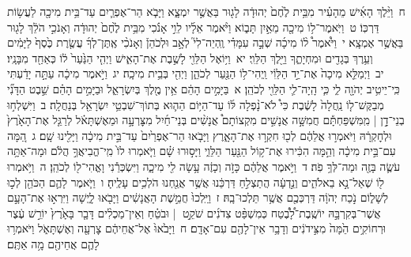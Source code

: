 \documentclass[18pt]{article}
\begin{document}
 {\loc ח~}וַיֵּ֨לֶךְ הָאִ֜ישׁ מֵהָעִ֗יר מִבֵּ֥ית לֶ֙חֶם֙ יְהוּדָ֔ה לָג֖וּר בַּאֲשֶׁ֣ר יִמְצָ֑א וַיָּבֹ֧א הַר־אֶפְרַ֛יִם עַד־בֵּ֥ית מִיכָ֖ה לַעֲשׂ֥וֹת דַּרְכּֽוֹ׃ \startlock
 {\loc ט~}וַיֹּֽאמֶר־ל֥וֹ מִיכָ֖ה מֵאַ֣יִן תָּב֑וֹא וַיֹּ֨אמֶר אֵלָ֜יו לֵוִ֣י אָנֹ֗כִי מִבֵּ֥ית לֶ֙חֶם֙ יְהוּדָ֔ה וְאָנֹכִ֣י הֹלֵ֔ךְ לָג֖וּר בַּאֲשֶׁ֥ר אֶמְצָֽא׃ \startlock
 {\loc י~}וַיֹּ֩אמֶר֩ ל֨וֹ מִיכָ֜ה שְׁבָ֣ה עִמָּדִ֗י וֶֽהְיֵה־לִי֮ לְאָ֣ב וּלְכֹהֵן֒ וְאָנֹכִ֨י אֶֽתֶּן־לְךָ֜ עֲשֶׂ֤רֶת כֶּ֙סֶף֙ לַיָּמִ֔ים וְעֵ֥רֶךְ בְּגָדִ֖ים וּמִחְיָתֶ֑ךָ וַיֵּ֖לֶךְ הַלֵּוִֽי׃ \startlock
 {\loc יא~}וַיּ֥וֹאֶל הַלֵּוִ֖י לָשֶׁ֣בֶת אֶת־הָאִ֑ישׁ וַיְהִ֤י הַנַּ֙עַר֙ ל֔וֹ כְּאַחַ֖ד מִבָּנָֽיו׃ \startlock
 {\loc יב~}וַיְמַלֵּ֤א מִיכָה֙ אֶת־יַ֣ד הַלֵּוִ֔י וַֽיְהִי־ל֥וֹ הַנַּ֖עַר לְכֹהֵ֑ן וַיְהִ֖י בְּבֵ֥ית מִיכָֽה׃ \startlock
 {\loc יג~}וַיֹּ֣אמֶר מִיכָ֔ה עַתָּ֣ה יָדַ֔עְתִּי כִּֽי־יֵיטִ֥יב יְהֹוָ֖ה לִ֑י כִּ֧י הָֽיָה־לִ֛י הַלֵּוִ֖י לְכֹהֵֽן׃ 
\startlock
 {\loc א~}בַּיָּמִ֣ים הָהֵ֔ם אֵ֥ין מֶ֖לֶךְ בְּיִשְׂרָאֵ֑ל וּבַיָּמִ֣ים הָהֵ֗ם שֵׁ֣בֶט הַדָּנִ֞י מְבַקֶּשׁ־ל֤וֹ נַֽחֲלָה֙ לָשֶׁ֔בֶת כִּי֩ לֹא־נָ֨פְלָה לּ֜וֹ עַד־הַיּ֥וֹם הַה֛וּא בְּתוֹךְ־שִׁבְטֵ֥י יִשְׂרָאֵ֖ל בְּנַחֲלָֽה׃ \startlock
 {\loc ב~}וַיִּשְׁלְח֣וּ בְנֵי־דָ֣ן  |  מִֽמִּשְׁפַּחְתָּ֡ם חֲמִשָּׁ֣ה אֲנָשִׁ֣ים מִקְצוֹתָם֩ אֲנָשִׁ֨ים בְּנֵי־חַ֜יִל מִצׇּרְעָ֣ה וּמֵאֶשְׁתָּאֹ֗ל לְרַגֵּ֤ל אֶת־הָאָ֙רֶץ֙ וּלְחׇקְרָ֔הּ וַיֹּאמְר֣וּ אֲלֵהֶ֔ם לְכ֖וּ חִקְר֣וּ אֶת־הָאָ֑רֶץ וַיָּבֹ֤אוּ הַר־אֶפְרַ֙יִם֙ עַד־בֵּ֣ית מִיכָ֔ה וַיָּלִ֖ינוּ שָֽׁם׃ \startlock
 {\loc ג~}הֵ֚מָּה עִם־בֵּ֣ית מִיכָ֔ה וְהֵ֣מָּה הִכִּ֔ירוּ אֶת־ק֥וֹל הַנַּ֖עַר הַלֵּוִ֑י וַיָּס֣וּרוּ שָׁ֗ם וַיֹּ֤אמְרוּ לוֹ֙ מִֽי־הֱבִיאֲךָ֣ הֲלֹ֔ם וּמָה־אַתָּ֥ה עֹשֶׂ֛ה בָּזֶ֖ה וּמַה־לְּךָ֥ פֹֽה׃ \startlock
 {\loc ד~}וַיֹּ֣אמֶר אֲלֵהֶ֔ם כָּזֹ֣ה וְכָזֶ֔ה עָ֥שָׂה לִ֖י מִיכָ֑ה וַיִּשְׂכְּרֵ֕נִי וָאֱהִי־ל֖וֹ לְכֹהֵֽן׃ \startlock
 {\loc ה~}וַיֹּ֥אמְרוּ ל֖וֹ שְׁאַל־נָ֣א בֵאלֹהִ֑ים וְנֵ֣דְעָ֔ה הֲתַצְלִ֣חַ דַּרְכֵּ֔נוּ אֲשֶׁ֥ר אֲנַ֖חְנוּ הֹלְכִ֥ים עָלֶֽיהָ׃ \startlock
 {\loc ו~}וַיֹּ֧אמֶר לָהֶ֛ם הַכֹּהֵ֖ן לְכ֣וּ לְשָׁל֑וֹם נֹ֣כַח יְהֹוָ֔ה דַּרְכְּכֶ֖ם אֲשֶׁ֥ר תֵּלְכוּ־בָֽהּ׃ \startlock
 {\loc ז~}וַיֵּֽלְכוּ֙ חֲמֵ֣שֶׁת הָאֲנָשִׁ֔ים וַיָּבֹ֖אוּ לָ֑יְשָׁה וַיִּרְא֣וּ אֶת־הָעָ֣ם אֲשֶׁר־בְּקִרְבָּ֣הּ יוֹשֶֽׁבֶת־לָ֠בֶ֠טַח כְּמִשְׁפַּ֨ט צִדֹנִ֜ים שֹׁקֵ֣ט  |  וּבֹטֵ֗חַ וְאֵין־מַכְלִ֨ים דָּבָ֤ר בָּאָ֙רֶץ֙ יוֹרֵ֣שׁ עֶ֔צֶר וּרְחוֹקִ֥ים הֵ֙מָּה֙ מִצִּ֣ידֹנִ֔ים וְדָבָ֥ר אֵין־לָהֶ֖ם עִם־אָדָֽם׃ \startlock
 {\loc ח~}וַיָּבֹ֙אוּ֙ אֶל־אֲחֵיהֶ֔ם צׇרְעָ֖ה וְאֶשְׁתָּאֹ֑ל וַיֹּאמְר֥וּ לָהֶ֛ם אֲחֵיהֶ֖ם מָ֥ה אַתֶּֽם׃ \startlock
\end{document}
